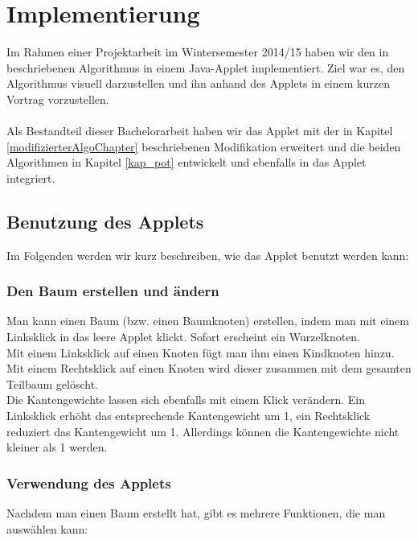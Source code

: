 \section{Implementierung}\label{kap_implementierung}

Im Rahmen einer Projektarbeit im Wintersemester 2014/15 haben wir den in \cite{cima_paper} beschriebenen Algorithmus in einem Java-Applet implementiert. Ziel war es, den Algorithmus visuell darzustellen und ihn anhand des Applets in einem kurzen Vortrag vorzustellen.
\\
\\
Als Bestandteil dieser Bachelorarbeit haben wir das Applet mit der in Kapitel \ref{modifizierterAlgoChapter} beschriebenen Modifikation erweitert und die beiden Algorithmen in Kapitel \ref{kap_pot} entwickelt und ebenfalls in das Applet integriert.


\subsection{Benutzung des Applets}

Im Folgenden werden wir kurz beschreiben, wie das Applet benutzt werden kann:

\subsubsection*{Den Baum erstellen und ändern}

Man kann einen Baum (bzw. einen Baumknoten) erstellen, indem man mit einem Linksklick in das leere Applet klickt. Sofort erscheint ein Wurzelknoten.\\
Mit einem Linksklick auf einen Knoten fügt man ihm einen Kindknoten hinzu. Mit einem Rechtsklick auf einen Knoten wird dieser zusammen mit dem gesamten Teilbaum gelöscht.\\
Die Kantengewichte lassen sich ebenfalls mit einem Klick verändern. Ein Linksklick erhöht das entsprechende Kantengewicht um 1, ein Rechtsklick reduziert das Kantengewicht um 1. Allerdings können die Kantengewichte nicht kleiner als 1 werden.


\subsubsection*{Verwendung des Applets}

Nachdem man einen Baum erstellt hat, gibt es mehrere Funktionen, die man auswählen kann:\\


